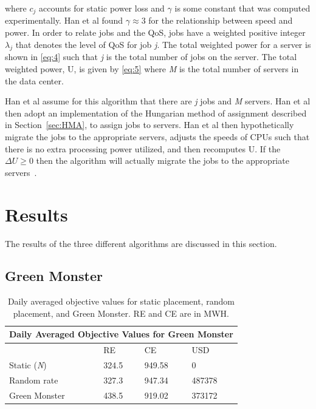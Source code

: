 \documentclass{sig-alternate}
\begin{document}
where $c_j$ accounts for static power loss and $\gamma$ is some constant that was computed experimentally. Han et al found $\gamma \approx 3$ for the relationship between speed and power. In order to relate jobs and the QoS, jobs have a weighted positive integer $\lambda_j$ that denotes the level of QoS for job \emph{j}. The total weighted power for a server is shown in \eqref{eq:4} such that \emph{j} is the total number of jobs on the server. The total weighted power, U, is given by \eqref{eq:5} where \emph{M} is the total number of servers in the data center.

Han et al assume for this algorithm that there are \emph{j} jobs and \emph{M} servers. Han et al then adopt an implementation of the Hungarian method of assignment described in Section~\ref{sec:HMA}, to assign jobs to servers. Han et al then hypothetically migrate the jobs to the appropriate servers, adjusts the speeds of CPUs such that there is no extra processing power utilized, and then recomputes U. If the $\Delta U \geq 0$ then the algorithm will actually migrate the jobs to the appropriate servers~\cite{Han}. 

\section{Results} 
\label{sec:results}

The results of the three different algorithms are discussed in this section.

\subsection{Green Monster}
\label{sec:GM}
\begin{table}[tb]
\begin{center}
\begin{tabular}{|l|l|l|l|}
    \hline
    \multicolumn{4}{|c|}{\textbf{Daily Averaged Objective Values for Green Monster}} \\
    \hline
    & RE &  CE & USD \\
    \hline
    Static (\emph{N}) & 324.5 & 949.58 & 0 \\
    Random rate & 327.3 & 947.34 & 487378\\
   	Green Monster & 438.5 & 919.02 & 373172\\
    \hline
\end{tabular}
\caption{Daily averaged objective values for static placement, random placement, and Green Monster. RE and CE are in MWH. }
\label{tab:GMV}
\end{center}
\end{table}
\end{document}
